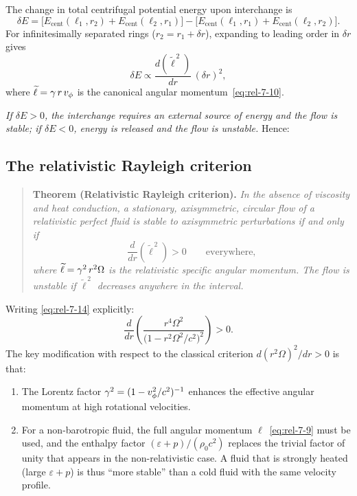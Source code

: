 The change in total centrifugal potential energy upon interchange is
\begin{equation}
\label{eq:rel-7-12}
\delta E = \bigl[E_{\mathrm{cent}}(\ell_{1},r_{2})
           + E_{\mathrm{cent}}(\ell_{2},r_{1})\bigr]
         - \bigl[E_{\mathrm{cent}}(\ell_{1},r_{1})
           + E_{\mathrm{cent}}(\ell_{2},r_{2})\bigr].
\end{equation}
For infinitesimally separated rings ($r_{2}=r_{1}+\delta r$),
expanding to leading order in $\delta r$ gives
\begin{equation}
\label{eq:rel-7-13}
\delta E \propto \frac{d(\widetilde{\ell}^{\,2})}{dr}\,(\delta r)^{2},
\end{equation}
where $\widetilde{\ell}=\gamma\,r\,v_{\phi}$ is the canonical angular
momentum~\eqref{eq:rel-7-10}.

\emph{If $\delta E>0$, the interchange requires an external source of
energy and the flow is stable; if $\delta E<0$, energy is released
and the flow is unstable.}  Hence:

\subsection{The relativistic Rayleigh criterion}
\label{sec:rel-7-66b}

\begin{quote}
\textbf{Theorem (Relativistic Rayleigh criterion).}
\emph{In the absence of viscosity and heat conduction, a stationary,
axisymmetric, circular flow of a relativistic perfect fluid is stable
to axisymmetric perturbations if and only if}
\begin{equation}
\label{eq:rel-7-14}
\boxed{\frac{d}{dr}\!\left(\widetilde{\ell}^{\,2}\right) > 0
\qquad\text{everywhere},}
\end{equation}
\emph{where $\widetilde{\ell}=\gamma^{2}\,r^{2}\Omega$ is the
relativistic specific angular momentum.  The flow is unstable if
$\widetilde{\ell}^{\,2}$ decreases anywhere in the interval.}
\end{quote}

\noindent
Writing \eqref{eq:rel-7-14} explicitly:
\begin{equation}
\label{eq:rel-7-15}
\frac{d}{dr}\!\left(\frac{r^{4}\Omega^{2}}
   {\bigl(1-r^{2}\Omega^{2}/c^{2}\bigr)^{2}}\right) > 0.
\end{equation}
The key modification with respect to the classical criterion
$d(r^{2}\Omega)^{2}/dr>0$ is that:
\begin{enumerate}
\item The Lorentz factor $\gamma^{2}=(1-v_{\phi}^{2}/c^{2})^{-1}$
  enhances the effective angular momentum at high rotational
  velocities.
\item For a non-barotropic fluid, the full angular momentum
  $\ell$~\eqref{eq:rel-7-9} must be used, and the enthalpy factor
  $(\varepsilon+p)/(\rho_{0}c^{2})$ replaces the trivial factor of
  unity that appears in the non-relativistic case.  A fluid that is
  strongly heated (large $\varepsilon+p$) is thus ``more stable''
  than a cold fluid with the same velocity profile.
\end{enumerate}

